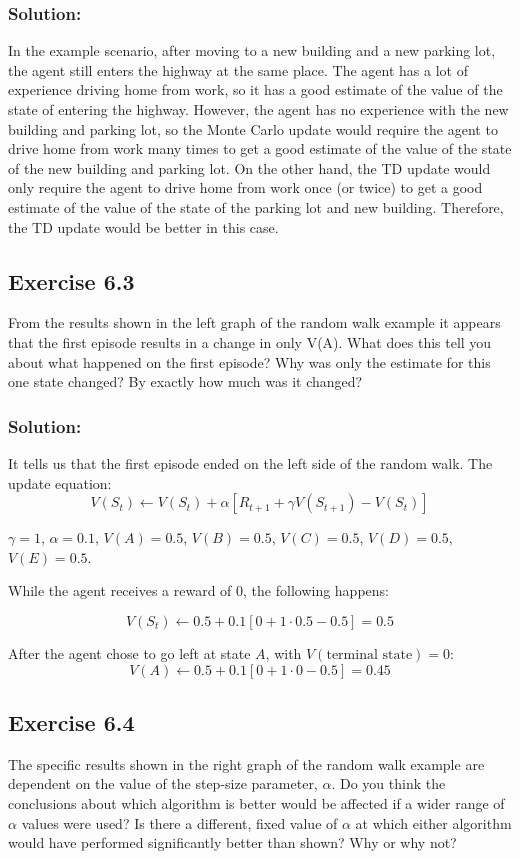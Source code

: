 \subsubsection*{Solution:}

In the example scenario, after moving to a new building and a new parking lot, the agent still enters the highway at the same place. 
The agent has a lot of experience driving home from work, so it has a good estimate of the value of the state of entering the highway.
However, the agent has no experience with the new building and parking lot, so the Monte Carlo update would require the agent to drive
home from work many times to get a good estimate of the value of the state of the new building and parking lot. On the other hand, the
TD update would only require the agent to drive home from work once (or twice) to get a good estimate of the value of the state of the parking lot
and new building. Therefore, the TD update would be better in this case.


\subsection*{Exercise 6.3}
From the results shown in the left graph of the random walk example it
appears that the first episode results in a change in only V(A). What does this tell you
about what happened on the first episode? Why was only the estimate for this one state
changed? By exactly how much was it changed? 

\subsubsection*{Solution:}
It tells us that the first episode ended on the left side of the random walk.
The update equation:
\[
V(S_t) \leftarrow V(S_t) + \alpha \left[R_{t+1} + \gamma V(S_{t+1}) - V(S_t)\right]
\]

$\gamma = 1$, $\alpha = 0.1$, $V(A) = 0.5$, $V(B) = 0.5$, $V(C) = 0.5$, $V(D) = 0.5$, $V(E) = 0.5$.

While the agent receives a reward of 0, the following happens:

\[
V(S_t) \leftarrow 0.5 + 0.1 \left[0 + 1 \cdot 0.5 - 0.5\right] = 0.5
\]

After the agent chose to go left at state $A$, with $V(\text{terminal state}) = 0$:
\[
V(A) \leftarrow 0.5 + 0.1 \left[0 + 1 \cdot 0 - 0.5\right] = 0.45
\]


\subsection*{Exercise 6.4}
The specific results shown in the right graph of the random walk example
are dependent on the value of the step-size parameter, $\alpha$. Do you think the conclusions
about which algorithm is better would be affected if a wider range of $\alpha$ values were used?
Is there a different, fixed value of $\alpha$ at which either algorithm would have performed
significantly better than shown? Why or why not?

